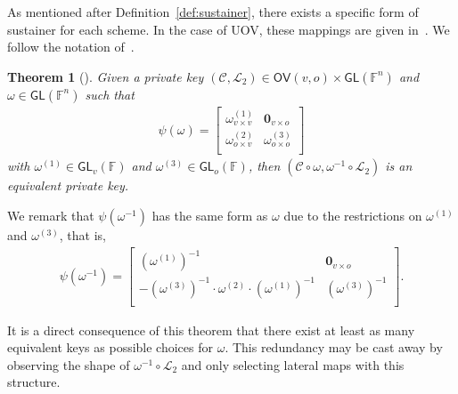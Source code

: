 \documentclass[12pt, a4paper, oneside]{memoir}
\newtheorem{theorem}{Theorem}[section]
\theoremstyle{definition}
\begin{document}
As mentioned after Definition~\ref{def:sustainer}, there exists a specific form of sustainer for each scheme. In the case of UOV, these mappings are given in~\cite[Section 4.3]{Wolf:201104}. We follow the notation of~\cite{Petzoldt:201307}.

\begin{theorem}[{\cite[Theorem 4.15]{Wolf:201104}}]
  Given a private key $(\mathcal{C}, \mathcal{L}_{2}) \in \mathsf{OV}(v, o) \times \mathsf{GL}(\mathbb{F}^{n})$ and $\omega \in \mathsf{GL}(\mathbb{F}^{n})$ such that
  \begin{align}
    \psi(\omega) =
    \begin{bmatrix}
      \omega_{v \times v}^{(1)} & \mathbf{0}_{v \times o} \\
      \omega_{o \times v}^{(2)} & \omega_{o \times o}^{(3)} \\
    \end{bmatrix}
  \end{align}
  with $\omega^{(1)} \in \mathsf{GL}_{v}(\mathbb{F})$ and $\omega^{(3)} \in \mathsf{GL}_{o}(\mathbb{F})$, then $(\mathcal{C} \circ \omega, \omega^{-1} \circ \mathcal{L}_{2})$ is an equivalent private key.
\end{theorem}

We remark that $\psi(\omega^{-1})$ has the same form as $\omega$ due to the restrictions on $\omega^{(1)}$ and $\omega^{(3)}$, that is,
\begin{align}
  \psi(\omega^{-1}) =
  \begin{bmatrix}
    (\omega^{(1)})^{-1}                                                 & \mathbf{0}_{v \times o}   \\
    -(\omega^{(3)})^{-1} \cdot \omega^{(2)} \cdot (\omega^{(1)})^{-1}   & (\omega^{(3)})^{-1}       \\
  \end{bmatrix}.
\end{align}

It is a direct consequence of this theorem that there exist at least as many equivalent keys as possible choices for $\omega$. This redundancy may be cast away by observing the shape of $\omega^{-1} \circ \mathcal{L}_{2}$ and only selecting lateral maps with this structure.
\end{document}

